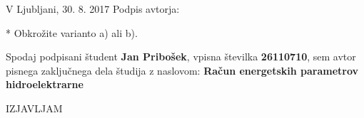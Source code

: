 V Ljubljani, 30. 8. 2017 \hfill Podpis avtorja: \hrulefill

\vspace{0.5cm}

* Obkrožite varianto a) ali b).











\iffalse

Spodaj podpisani študent \textbf{Jan Pribošek}, vpisna številka \textbf{26110710}, sem avtor pisnega zaključnega dela študija z naslovom: \textbf{Račun energetskih parametrov hidroelektrarne}

\begin{center}
	IZJAVLJAM
\end{center}


